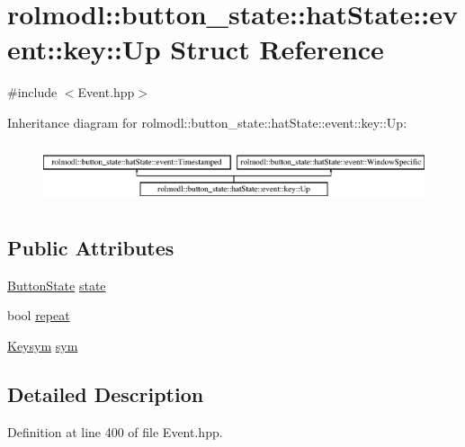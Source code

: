 \hypertarget{structrolmodl_1_1button__state_1_1hat_state_1_1event_1_1key_1_1_up}{}\section{rolmodl\+::button\+\_\+state\+::hat\+State\+::event\+::key\+::Up Struct Reference}
\label{structrolmodl_1_1button__state_1_1hat_state_1_1event_1_1key_1_1_up}


{\ttfamily \#include $<$Event.\+hpp$>$}

Inheritance diagram for rolmodl\+::button\+\_\+state\+::hat\+State\+::event\+::key\+::Up\+:\begin{figure}[H]
\begin{center}
\leavevmode
\includegraphics[height=1.761006cm]{structrolmodl_1_1button__state_1_1hat_state_1_1event_1_1key_1_1_up}
\end{center}
\end{figure}
\subsection*{Public Attributes}
\begin{DoxyCompactItemize}
\item 
\mbox{\hyperlink{namespacerolmodl_ad08ec5c56aa1db118f871357b2d475fd}{Button\+State}} \mbox{\hyperlink{structrolmodl_1_1button__state_1_1hat_state_1_1event_1_1key_1_1_up_acb92083e8d725bc3c3cab10c8fa1b44d}{state}}
\item 
bool \mbox{\hyperlink{structrolmodl_1_1button__state_1_1hat_state_1_1event_1_1key_1_1_up_aa4878236f55430dbbfdbf74edada006b}{repeat}}
\item 
\mbox{\hyperlink{structrolmodl_1_1button__state_1_1_keysym}{Keysym}} \mbox{\hyperlink{structrolmodl_1_1button__state_1_1hat_state_1_1event_1_1key_1_1_up_a2fc8d921fe6e0561f726f248752a684c}{sym}}
\end{DoxyCompactItemize}


\subsection{Detailed Description}


Definition at line 400 of file Event.\+hpp.




